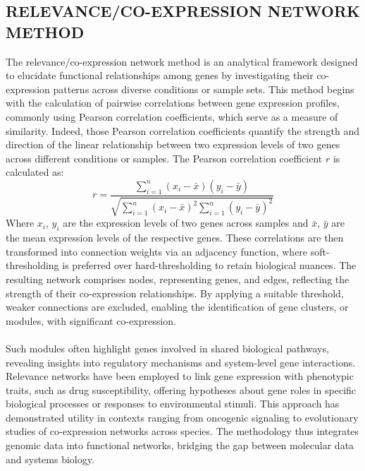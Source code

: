 \subsection{RELEVANCE/CO-EXPRESSION NETWORK METHOD}\label{subsec:relevance-co-expression-network-method}

The relevance/co-expression network method is an analytical framework designed to elucidate functional relationships among genes by investigating their co-expression patterns across diverse conditions or sample sets.
This method begins with the calculation of pairwise correlations between gene expression profiles, commonly using Pearson correlation coefficients, which serve as a measure of similarity\cite{zhang_general_2005}.
Indeed, those Pearson correlation coefficients quantify the strength and direction of the linear relationship between two expression levels of two genes across different conditions or samples.
The Pearson correlation coefficient $r$ is calculated as:
\[r = \frac{\sum_{i=1}^{n} (x_i - \bar{x})(y_i - \bar{y})}{\sqrt{\sum_{i=1}^{n} (x_i - \bar{x})^2 \sum_{i=1}^{n} (y_i - \bar{y})^2}}\]
Where $x_i$, $y_i$ are the expression levels of two genes across samples and $\bar{x}$, $\bar{y}$ are the mean expression levels of the respective genes.
These correlations are then transformed into connection weights via an adjacency function, where soft-thresholding is preferred over hard-thresholding to retain biological nuances\cite{butte_discovering_2000, oldham_conservation_2006}.
The resulting network comprises nodes, representing genes, and edges, reflecting the strength of their co-expression relationships.
By applying a suitable threshold, weaker connections are excluded, enabling the identification of gene clusters, or modules, with significant co-expression\cite{schmitt_elucidation_2004}.
\\\\
Such modules often highlight genes involved in shared biological pathways, revealing insights into regulatory mechanisms and system-level gene interactions\cite{horvath_analysis_2006}.
Relevance networks have been employed to link gene expression with phenotypic traits, such as drug susceptibility, offering hypotheses about gene roles in specific biological processes or responses to environmental stimuli\cite{butte_discovering_2000}.
This approach has demonstrated utility in contexts ranging from oncogenic signaling to evolutionary studies of co-expression networks across species\cite{oldham_conservation_2006}.
The methodology thus integrates genomic data into functional networks, bridging the gap between molecular data and systems biology.
\\\\

